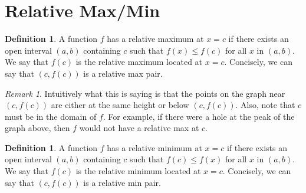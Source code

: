 \documentclass[reqno,psamsfonts]{amsart}
\theoremstyle{definition}
\newtheorem{defn}[thm]{Definition}
\theoremstyle{remark}
\newtheorem{rem}[thm]{Remark}
\numberwithin{equation}{section}
\begin{document}
\newpage
\section*{Relative Max/Min}

\begin{defn}
A function $f$ has a relative maximum at $x=c$ if there exists an open interval $(a,b)$ containing $c$ such that $f(x)\leq f(c)$ for all $x$ in $(a,b)$. We say that $f(c)$ is the relative maximum located at $x=c$. Concisely, we can say that $(c, f(c))$ is a relative max pair.  
\end{defn}

\begin{center}
\end{center}

\begin{rem}
Intuitively what this is saying is that the points on the graph near $(c,f(c))$ are either at the same height or below $(c,f(c))$. Also, note that $c$ must be in the domain of $f$. For example, if there were a hole at the peak of the graph above, then $f$ would not have a relative max at $c$. 
\end{rem}



\begin{defn}
A function $f$ has a relative minimum at $x=c$ if there exists an open interval $(a,b)$ containing $c$ such that $f(c)\leq f(x)$ for all $x$ in $(a,b)$. We say that $f(c)$ is the relative minimum located at $x=c$. Concisely, we can say that $(c, f(c))$ is a relative min pair.  
\end{defn}

\begin{center}
\end{center}
\end{document}
